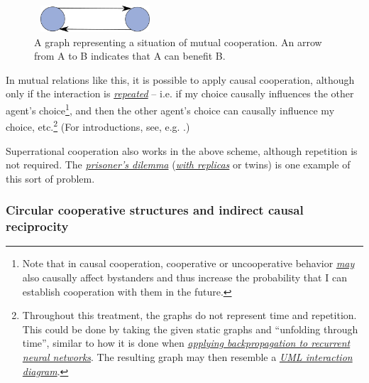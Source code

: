 \begin{figure}[h!]
    \centering
    \includegraphics[width=1.78646in,height=0.38583in]{figs/mutual-cooperation-graph}
    \caption{A graph representing a situation of mutual cooperation. An arrow from A to B indicates
    that A can benefit B.}
    \label{mutual-cooperation-graph}
\end{figure}

In mutual relations like this, it is possible to apply causal
cooperation, although only if the interaction is
\href{https://en.wikipedia.org/wiki/Prisoner\%27s_dilemma\#The_iterated_prisoner.27s_dilemma}{\emph{repeated}}
-- i.e. if my choice causally influences the other agent's
choice\footnote{Note that in causal cooperation, cooperative or
  uncooperative behavior
  \href{https://en.wikipedia.org/wiki/Reciprocity_(evolution)\#Indirect_reciprocity}{\emph{may}}
  also causally affect bystanders and thus increase the probability that
  I can establish cooperation with them in the future.}, and then the
other agent's choice can causally influence my choice, etc.\footnote{Throughout
  this treatment, the graphs do not represent time and repetition. This
  could be done by taking the given static graphs and ``unfolding
  through time'', similar to how it is done when
  \href{https://en.wikipedia.org/wiki/Backpropagation_through_time}{\emph{applying
  backpropagation to recurrent neural networks}}. The resulting graph
  may then resemble a
  \href{https://en.wikipedia.org/wiki/Unified_Modeling_Language\#Interaction_diagrams}{\emph{UML
  interaction diagram}}.} (For introductions, see, e.g.
\cite{Axelrod2006-ci,Trivers1971-rb,Fehr1999-pd,Dawkins1976-cd,Taylor1987-wn,Buss2015-kp}.)

Superrational cooperation also works in the above scheme, although
repetition is not required. The
\href{https://en.wikipedia.org/wiki/Prisoner\%27s_dilemma}{\emph{prisoner's
dilemma}}
(\href{http://plato.stanford.edu/entries/prisoner-dilemma/\#PDRepCauDecThe}{\emph{with
replicas}} or twins) is one example of this sort of problem.

\subsubsection{Circular cooperative structures and indirect causal
reciprocity}\label{circular-cooperative-structures-and-indirect-causal-reciprocity}

